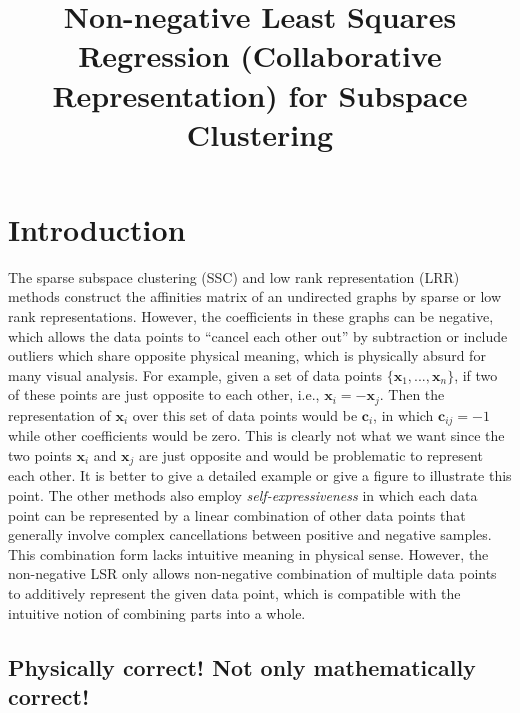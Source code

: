 \documentclass[10pt,twocolumn,letterpaper]{article}
\begin{document}
\title{Non-negative Least Squares Regression (Collaborative Representation) for Subspace Clustering}

\maketitle



\begin{abstract}

\end{abstract}

\section{Introduction}

The sparse subspace clustering (SSC) \cite{ssccvpr,sscpami} and low rank representation (LRR) \cite{lrricml,lrrpami} methods construct the affinities matrix of an undirected graphs by sparse or low rank representations. However, the coefficients in these graphs can be negative, which allows the data points to ``cancel each other out'' by subtraction or include outliers which share opposite physical meaning, which is physically absurd for many visual analysis. For example, given a set of data points $\{\bm{x}_{1},...,\bm{x}_{n}\}$, if two of these points are just opposite to each other, i.e., $\bm{x}_{i}=-\bm{x}_{j}$. Then the representation of $\bm{x}_{i}$ over this set of data points would be $\bm{c}_{i}$, in which $\bm{c}_{ij}=-1$ while other coefficients would be zero. This is clearly not what we want since the two points $\bm{x}_{i}$ and $\bm{x}_{j}$ are just opposite and would be problematic to represent each other. It is better to give a detailed example or give a figure to illustrate this point. The other methods also employ \textsl{self-expressiveness} in which each data point can be represented by a linear combination of other data points that generally involve complex cancellations between positive and negative samples. This combination form lacks intuitive meaning in physical sense. However, the non-negative LSR only allows non-negative combination of multiple data points to additively represent the given data point, which is compatible with the intuitive notion of combining parts into a whole.

\subsection{Physically correct! Not only mathematically correct!}
\end{document}
